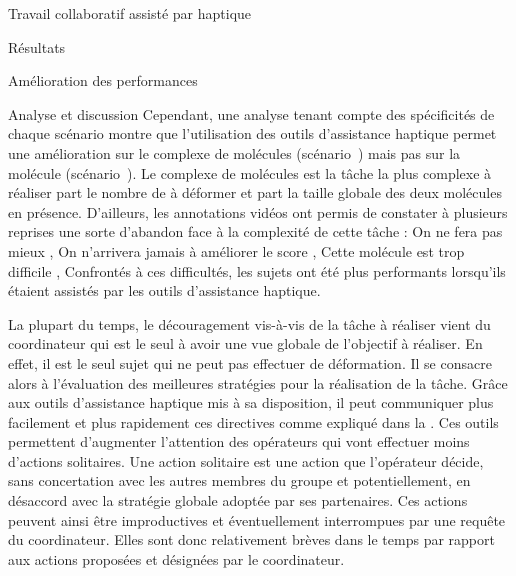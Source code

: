 \documentclass[myfrancais,ngerman,english,frenchb]{mythesis}
\begin{document}
\begin{mychapter}{Travail collaboratif assisté par haptique}
\begin{mysection}{Résultats}
\begin{mysubsection}{Amélioration des performances}
\begin{mysubsubsection}{Analyse et discussion}
					Cependant, une analyse tenant compte des spécificités de chaque scénario montre que l'utilisation des outils d'assistance haptique permet une amélioration sur le complexe de molécules \myNusENusG (scénario~) mais pas sur la molécule \myUbiquitin (scénario~).
					Le complexe de molécules \myNusENusG est la tâche la plus complexe à réaliser part le nombre de  à déformer et part la taille globale des deux molécules en présence.
					D'ailleurs, les annotations vidéos ont permis de constater à plusieurs reprises une sorte d'abandon face à la complexité de cette tâche : \og On ne fera pas mieux \fg, \og On n'arrivera jamais à améliorer le score \fg, \og Cette molécule est trop difficile \fg, \myetc
					Confrontés à ces difficultés, les sujets ont été plus performants lorsqu'ils étaient assistés par les outils d'assistance haptique.

					La plupart du temps, le découragement vis-à-vis de la tâche à réaliser vient du coordinateur qui est le seul à avoir une vue globale de l'objectif à réaliser.
					En effet, il est le seul sujet qui ne peut pas effectuer de déformation.
					Il se consacre alors à l'évaluation des meilleures stratégies pour la réalisation de la tâche.
					Grâce aux outils d'assistance haptique mis à sa disposition, il peut communiquer plus facilement et plus rapidement ces directives comme expliqué dans la .
					Ces outils permettent d'augmenter l'attention des opérateurs qui vont effectuer moins d'actions solitaires.
					Une action solitaire est une action que l'opérateur décide, sans concertation avec les autres membres du groupe et potentiellement, en désaccord avec la stratégie globale adoptée par ses partenaires.
					Ces actions peuvent ainsi être improductives et éventuellement interrompues par une requête du coordinateur.
					Elles sont donc relativement brèves dans le temps par rapport aux actions proposées et désignées par le coordinateur.


\end{mysubsubsection}
\end{mysubsection}
\end{mysection}
\end{mychapter}
\end{document}
